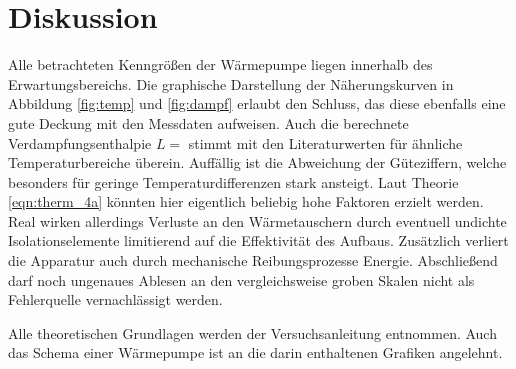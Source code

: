 \section{Diskussion}
\label{sec:diskussion}

Alle betrachteten Kenngrößen der Wärmepumpe liegen innerhalb des Erwartungsbereichs. Die graphische
Darstellung der Näherungskurven in Abbildung \ref{fig:temp} und \ref{fig:dampf} erlaubt den Schluss,
das diese ebenfalls eine gute Deckung mit den Messdaten aufweisen. Auch die berechnete
Verdampfungsenthalpie $L = $ stimmt mit den Literaturwerten für ähnliche
Temperaturbereiche \cite{c_cl2_f2} überein. Auffällig ist die Abweichung der Güteziffern,
welche besonders für geringe Temperaturdifferenzen stark ansteigt. Laut Theorie \eqref{eqn:therm_4a}
könnten hier eigentlich beliebig hohe Faktoren erzielt werden. Real wirken allerdings Verluste an den
Wärmetauschern durch eventuell undichte Isolationselemente limitierend auf die Effektivität des Aufbaus.
Zusätzlich verliert die Apparatur auch durch mechanische Reibungsprozesse Energie. Abschließend darf
noch ungenaues Ablesen an den vergleichsweise groben Skalen nicht als Fehlerquelle vernachlässigt werden.

\vfill

Alle theoretischen Grundlagen werden der Versuchsanleitung \cite{pumpe} entnommen. Auch das
Schema einer Wärmepumpe ist an die darin enthaltenen Grafiken angelehnt.

\vfill
\vfill
\vfill
\vfill
\vfill
\vfill
\vfill
\vfill
\vfill
\vfill

